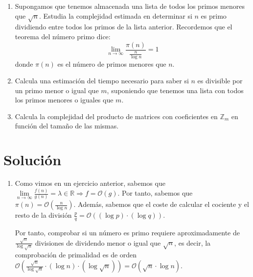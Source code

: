 	\begin{enumerate}
		\item Supongamos que tenemos almacenada una lista de todos los primos menores que $\sqrt{n}$. Estudia la
		complejidad estimada en determinar si $n$ es primo dividiendo entre todos los primos de la lista anterior.
		Recordemos que el teorema del número primo dice:
		$$\lim\limits_{n \rightarrow \infty} \frac{\pi (n)}{\frac{n}{\log n}} = 1$$
		donde $\pi (n)$ es el número de primos menores que $n$.
		\item Calcula una estimación del tiempo necesario para saber si $n$ es divisible por un primo menor o
		igual que $m$, suponiendo que tenemos una lista con todos los primos menores o iguales que $m$.
		\item Calcula la complejidad del producto de matrices con coeficientes en $\mathbb{Z}_m$ en función del
		tamaño de las mismas.
	\end{enumerate}
\section*{Solución}
	\begin{enumerate}
		\item Como vimos en un ejercicio anterior, sabemos que $\lim\limits_{n \rightarrow \infty} \frac{f(n)}
		{g(n)} = \lambda \in \mathbb{R} \Rightarrow f = \mathcal{O}(g)$. Por tanto, sabemos que $\pi (n) =
		\mathcal{O}\left(\frac{n}{\log n}\right)$. Además, sabemos que el coste de calcular el cociente y el
		resto de la división $\frac{p}{q} = \mathcal{O}((\log p) \cdot (\log q))$.
		
		Por tanto, comprobar si un número es primo requiere aproximadamente de $\frac{\sqrt{n}}{\log \sqrt{n}}$
		divisiones de dividendo menor o igual que $\sqrt{n}$, es decir, la comprobación de primalidad es de orden
		$\mathcal{O}\left(\frac{\sqrt{n}} {\log \sqrt{n}} \cdot (\log n) \cdot \left(\log \sqrt{n}\right)\right)
		= \mathcal{O} \left(\sqrt{n} \cdot \log n\right)$.
		
	\end{enumerate}
